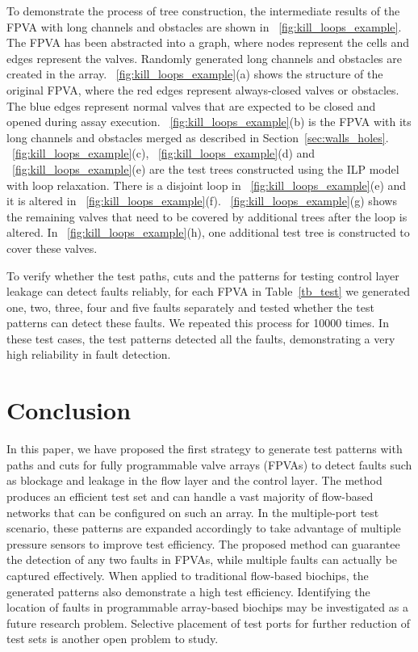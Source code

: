 \documentclass[journal,twoside]{IEEEtran}
\begin{document}
To demonstrate the process of
 tree construction, the intermediate results of the  FPVA
with long channels and obstacles are shown in \figname~\ref{fig:kill_loops_example}. 
The FPVA has been abstracted into a graph, where nodes represent the
cells and edges represent the valves. Randomly generated long channels and obstacles are
created in the array. 
\figname~\ref{fig:kill_loops_example}(a) shows the structure of the original
FPVA, where the red edges represent always-closed valves or 
obstacles. The blue edges represent normal valves that are expected to be
closed and opened during assay execution.
\figname~\ref{fig:kill_loops_example}(b) is the FPVA with its long channels and
obstacles merged 
as described in Section~\ref{sec:walls_holes}. \figname~\ref{fig:kill_loops_example}(c), \figname~\ref{fig:kill_loops_example}(d) and \figname~\ref{fig:kill_loops_example}(e) are
the test trees constructed using the ILP model 
with loop relaxation. There is a disjoint loop in \figname~\ref{fig:kill_loops_example}(e) and it is altered  
in \figname~\ref{fig:kill_loops_example}(f).
\figname~\ref{fig:kill_loops_example}(g) shows the remaining valves that need
to be covered by additional trees
after the loop is altered. In \figname~\ref{fig:kill_loops_example}(h), one
additional test tree is constructed to cover these valves.

To verify whether the test paths, cuts and the patterns for testing control
layer leakage can detect faults reliably, for each FPVA in
Table~\ref{tb_test} we generated one, two, three, four and five faults
separately and tested whether the test patterns can detect these faults. We
repeated this process for \num[mode=text]{10000} times.  In these test cases,
the test patterns detected all the faults, 
demonstrating a very high reliability in fault detection.


\section{Conclusion}\label{sec:conclusion}

In this paper, we have proposed the first strategy to generate
test patterns with paths and cuts for fully programmable valve
arrays (FPVAs) to detect faults such as blockage and leakage in the flow
layer and the control layer. The method produces an efficient test set and
can handle a vast majority of flow-based networks that can be
configured on such an array.
In the multiple-port test scenario, these patterns are expanded accordingly to take
advantage of multiple pressure sensors to improve test efficiency.
The proposed method can guarantee 
the detection of any two faults in FPVAs, while multiple faults can
actually be captured effectively. 
When applied to traditional flow-based biochips,
the generated patterns also demonstrate a high test efficiency. Identifying the
location of faults in programmable array-based biochips may be investigated
as a future research problem. Selective placement of test ports for
further reduction of test sets is another open problem to study.
\end{document}
